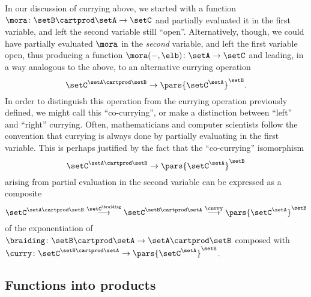 \begin{remark}
In our discussion of currying above, we started with a function $\mora \colon \setB \cartprod \setA \to \setC$ and partially evaluated it in the first variable, and left the second variable still ``open''. Alternatively, though, we could have partially evaluated $\mora$ in the \emph{second} variable, and left the first variable open, thus producing a function $\mora(-, \elb) \colon \setA \to \setC$ and leading, in a way analogous to the above, to an alternative currying operation 
\begin{equation}
\setC^{\setA \cartprod \setB} \to \pars{\setC^\setA}^\setB.
\end{equation}
In order to distinguish this operation from the currying operation previously defined, we might call this ``co-currying'', or make a distinction between ``left'' and ``right'' currying. Often, mathematicians and computer scientists follow the convention that currying is always done by partially evaluating in the first variable. This is perhaps justified by the fact that the ``co-currying'' isomorphism
\begin{equation}
\setC^{\setA \cartprod \setB} \to \pars{\setC^\setA}^\setB
\end{equation}
arising from partial evaluation in the second variable can be expressed as a composite
\begin{equation}
\setC^{\setA \cartprod \setB} \overset{{\setC^{\braiding}}}{\longrightarrow} \setC^{\setB \cartprod \setA} \overset{\curry}{\longrightarrow} \pars{\setC^\setA}^\setB
\end{equation}
of the exponentiation of $\braiding \colon \setB \cartprod \setA \to \setA \cartprod \setB$ composed with $\curry \colon \setC^{\setB \cartprod \setA} \to \pars{\setC^\setA}^\setB$.  
\end{remark}

\subsection{Functions into products}

